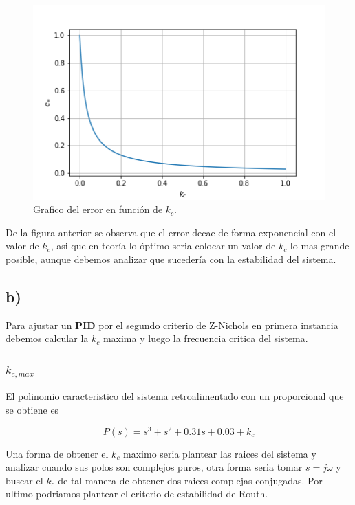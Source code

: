 \documentclass{article}
\begin{document}
        \begin{figure}[!htb]
            \centering
            \includegraphics[width=\textwidth]{Img/1-a.png}
            \caption{Grafico del error en función de $k_c$.}
            \label{}
        \end{figure}

        De la figura anterior se observa que el error decae de forma exponencial con el valor de $k_c$, asi que 
        en teoría lo óptimo seria colocar un valor de $k_c$ lo mas grande posible, aunque debemos analizar que sucedería
        con la estabilidad del sistema.



        \subsection{b)}

    Para ajustar un \textbf{PID} por el segundo criterio de Z-Nichols en primera instancia debemos calcular la 
    $k_c$ maxima y luego la frecuencia critica del sistema.

    \subsubsection{$k_{c, max}$}

    El polinomio caracteristico del sistema retroalimentado con un proporcional que se obtiene es 

    \begin{equation}
        P(s) = s^3 + s^2 + 0.31s + 0.03 + k_c
    \end{equation}

    Una forma de obtener el $k_c$ maximo seria plantear las raices del sistema y analizar cuando sus polos son complejos puros, 
    otra forma seria tomar $s=j\omega$ y buscar el $k_c$ de tal manera de obtener dos raices complejas conjugadas. Por 
    ultimo podriamos plantear el criterio de estabilidad de Routh.
\end{document}
